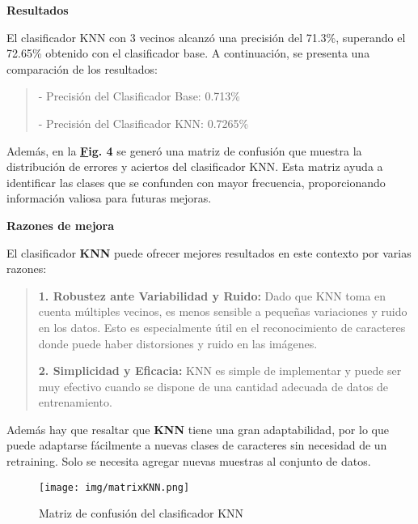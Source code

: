 \documentclass[a4paper, 12pt]{article}
\begin{document}
\textbf{Resultados}

El clasificador KNN con 3 vecinos alcanzó una precisión del 71.3\%, superando el 72.65\% obtenido con el clasificador base. A continuación, se presenta una comparación de los resultados:

\begin{quote}
	- Precisión del Clasificador Base: 0.713\%
	
	- Precisión del Clasificador KNN: 0.7265\%
\end{quote}

Además, en la \textbf{\hyperref[fig:matrixknn] Fig. 4} se generó una matriz de confusión que muestra la distribución de errores y aciertos del clasificador KNN. Esta matriz ayuda a identificar las clases que se confunden con mayor frecuencia, proporcionando información valiosa para futuras mejoras.

\textbf{Razones de mejora}

El clasificador \textbf{KNN} puede ofrecer mejores resultados en este contexto por varias razones:
\begin{quote}
	\textbf{1. Robustez ante Variabilidad y Ruido:} Dado que KNN toma en cuenta múltiples vecinos, es menos sensible a pequeñas variaciones y ruido en los datos. Esto es especialmente útil en el reconocimiento de caracteres donde puede haber distorsiones y ruido en las imágenes.

	\textbf{2. Simplicidad y Eficacia:} KNN es simple de implementar y puede ser muy efectivo cuando se dispone de una cantidad adecuada de datos de entrenamiento. 
	
\end{quote}

Además hay que resaltar que \textbf{KNN} tiene una gran adaptabilidad, por lo que puede adaptarse fácilmente a nuevas clases de caracteres sin necesidad de un retraining. Solo se necesita agregar nuevas muestras al conjunto de datos.

\begin{figure}[h]
	\centering
	\texttt{[image: img/matrixKNN.png]}
	\caption{Matriz de confusión del clasificador KNN}
	\label{fig:matrixknn}
\end{figure}
\end{document}

